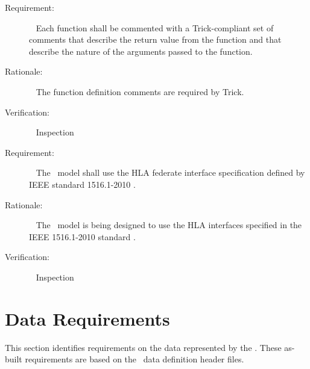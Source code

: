 \documentclass[twoside,11pt,titlepage]{report}
\begin{document}
\label{reqt:func_trick_comments}
\begin{description}
  \item[Requirement:]\ \newline
    Each function shall be commented with a Trick-compliant
    set of comments that describe the return value from the
    function and that describe the nature of the arguments
    passed to the function.

  \item[Rationale:]\ \newline
    The function definition comments are required by Trick.

  \item[Verification:]\ \newline
    Inspection
\end{description}


\label{reqt:hla_federate_interface}
\begin{description}
  \item[Requirement:]\ \newline
    The \TrickHLA\ model shall use the HLA federate interface
    specification defined by IEEE standard 1516.1-2010 \cite{IEEE1516:API}.

  \item[Rationale:]\ \newline
    The \TrickHLA\ model is being designed to use the HLA interfaces
    specified in the IEEE 1516.1-2010 standard \cite{IEEE1516:API}.

  \item[Verification:]\ \newline
    Inspection
\end{description}



\section{Data Requirements}\label{sec:data_reqts}

This section identifies requirements on the data
represented by the \TrickHLA.  These as-built requirements are
based on the \TrickHLA\ data definition header files.
\end{document}
